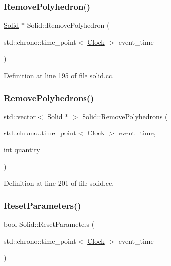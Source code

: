 \subsubsection{\texorpdfstring{Remove\+Polyhedron()}{RemovePolyhedron()}}
{\footnotesize\ttfamily \mbox{\hyperlink{class_solid}{Solid}} $\ast$ Solid\+::\+Remove\+Polyhedron (\begin{DoxyParamCaption}\item[{std\+::chrono\+::time\+\_\+point$<$ \mbox{\hyperlink{universe_8h_a0ef8d951d1ca5ab3cfaf7ab4c7a6fd80}{Clock}} $>$}]{event\+\_\+time }\end{DoxyParamCaption})}



Definition at line 195 of file solid.\+cc.

\mbox{\label{class_solid_a0fc53641571eb796c9d6bc33ae7a7138}} 
\subsubsection{\texorpdfstring{Remove\+Polyhedrons()}{RemovePolyhedrons()}}
{\footnotesize\ttfamily std\+::vector$<$ \mbox{\hyperlink{class_solid}{Solid}} $\ast$ $>$ Solid\+::\+Remove\+Polyhedrons (\begin{DoxyParamCaption}\item[{std\+::chrono\+::time\+\_\+point$<$ \mbox{\hyperlink{universe_8h_a0ef8d951d1ca5ab3cfaf7ab4c7a6fd80}{Clock}} $>$}]{event\+\_\+time,  }\item[{int}]{quantity }\end{DoxyParamCaption})}



Definition at line 201 of file solid.\+cc.

\mbox{\label{class_solid_ac43dc78fa7f6a3348fc99751ff6bbc52}} 
\subsubsection{\texorpdfstring{Reset\+Parameters()}{ResetParameters()}}
{\footnotesize\ttfamily bool Solid\+::\+Reset\+Parameters (\begin{DoxyParamCaption}\item[{std\+::chrono\+::time\+\_\+point$<$ \mbox{\hyperlink{universe_8h_a0ef8d951d1ca5ab3cfaf7ab4c7a6fd80}{Clock}} $>$}]{event\+\_\+time }\end{DoxyParamCaption})}




